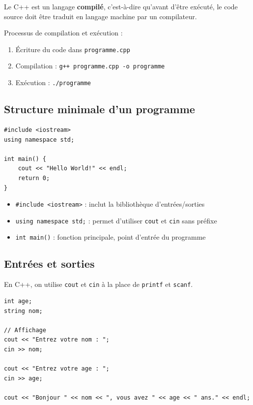 \documentclass[12pt,a4paper]{article}
\begin{document}
Le C++ est un langage \textbf{compilé}, c'est-à-dire qu'avant d'être exécuté, le code source doit être traduit en langage machine par un compilateur.

\begin{exemple}
Processus de compilation et exécution :
\begin{enumerate}
    \item Écriture du code dans \texttt{programme.cpp}
    \item Compilation : \texttt{g++ programme.cpp -o programme}
    \item Exécution : \texttt{./programme}
\end{enumerate}
\end{exemple}

\subsection{Structure minimale d'un programme}

\begin{lstlisting}[style=cpp, caption={Programme minimal en C++}]
#include <iostream>
using namespace std;

int main() {
    cout << "Hello World!" << endl;
    return 0;
}
\end{lstlisting}

\begin{itemize}
    \item \texttt{\#include <iostream>} : inclut la bibliothèque d'entrées/sorties
    \item \texttt{using namespace std;} : permet d'utiliser \texttt{cout} et \texttt{cin} sans préfixe
    \item \texttt{int main()} : fonction principale, point d'entrée du programme
\end{itemize}

\subsection{Entrées et sorties}

En C++, on utilise \texttt{cout} et \texttt{cin} à la place de \texttt{printf} et \texttt{scanf}.

\begin{lstlisting}[style=cpp, caption={Utilisation de cout et cin}]
int age;
string nom;

// Affichage
cout << "Entrez votre nom : ";
cin >> nom;

cout << "Entrez votre age : ";
cin >> age;

cout << "Bonjour " << nom << ", vous avez " << age << " ans." << endl;
\end{lstlisting}
\end{document}
